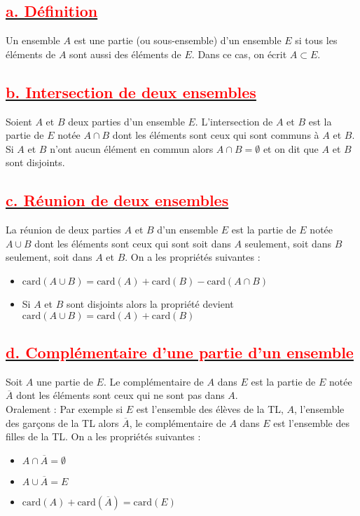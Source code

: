 \documentclass[12pt]{article}
\begin{document}
\subsection*{\underline{\textbf{\textcolor{red}{a. Définition}}}}
Un ensemble \(A\) est une partie (ou sous-ensemble) d’un ensemble \(E\) si tous les éléments de \(A\) sont aussi des éléments de \(E\). Dans ce cas, on écrit \(A \subset E\).
\subsection*{\underline{\textbf{\textcolor{red}{b. Intersection de deux ensembles}}}}
Soient \( A \) et \( B \) deux parties d’un ensemble \( E \). L’intersection de \( A \) et \( B \) est la partie de \( E \) notée \( A \cap B \) dont les éléments sont ceux qui sont communs à \( A \) et \( B \).
Si \( A \) et \( B \) n’ont aucun élément en commun alors \( A \cap B = \emptyset \) et on dit que \( A \) et \( B \) sont disjoints.
\subsection*{\underline{\textbf{\textcolor{red}{c. Réunion de deux ensembles}}}}
La réunion de deux parties \( A \) et \( B \) d’un ensemble \( E \) est la partie de \( E \) notée \( A \cup B \) dont les éléments sont ceux qui sont soit dans \( A \) seulement, soit dans \( B \) seulement, soit dans \( A \) et \( B \). On a les propriétés suivantes :
\begin{itemize}
    \item \( \text{card}(A \cup B) = \text{card}(A) + \text{card}(B) - \text{card}(A \cap B) \)
    \item Si \( A \) et \( B \) sont disjoints alors la propriété devient\\ \( \text{card}(A \cup B) = \text{card}(A) + \text{card}(B) \)
\end{itemize}
\subsection*{\underline{\textbf{\textcolor{red}{d. Complémentaire d’une partie d’un ensemble}}}}
Soit \( A \) une partie de \( E \). Le complémentaire de \( A \) dans \( E \) est la partie de \( E \) notée \( \overline{A} \) dont les éléments sont ceux qui ne sont pas dans \( A \).\\

Oralement : Par exemple si \( E \) est l’ensemble des élèves de la TL, \( A \), l’ensemble des garçons de la TL alors \( \overline{A} \), le complémentaire de \( A \) dans \( E \) est l’ensemble des filles de la TL. On a les propriétés suivantes :
\begin{itemize}
    \item \( A \cap \overline{A} = \emptyset \)
    \item \( A \cup \overline{A} = E \)
    \item \( \text{card}(A) + \text{card}(\overline{A}) = \text{card}(E) \)
\end{itemize}
\end{document}
